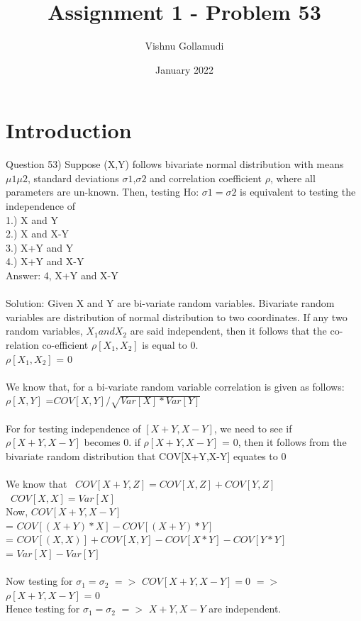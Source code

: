 \documentclass{article}
\title{Assignment 1 - Problem 53}
\author{Vishnu Gollamudi}
\date{January 2022}
\begin{document}
\maketitle

\section{Introduction}
Question 53) Suppose (X,Y) follows bivariate normal distribution with means $\mu1  \mu2$, standard deviations $\sigma1$,$\sigma2$ and correlation coefficient $\rho$, where all parameters are un-known. Then, testing Ho: $\sigma1=\sigma2$ is equivalent to testing the independence of  
\\
1.) X and Y \\
2.) X and X-Y \\
3.) X+Y and Y \\
4.) X+Y and X-Y \\

Answer: 4, X+Y and X-Y\\
\\
Solution:
Given X and Y are bi-variate random variables.  Bivariate random variables are distribution of normal distribution to two coordinates. If any two random variables, $ X_1 and X_2$ are said independent, then it follows that the co-relation co-efficient $\rho[X_1,X_2]$ is equal to 0. \\

\quad \quad \quad \quad $\rho[X_1,X_2]$  = 0 \\
\\
We know that, for a bi-variate random variable correlation is given as follows:\\
\quad \quad \quad $\rho[X,Y]$ =$ COV[X,Y] / \sqrt{Var[X] * Var[Y]}$\\
\\
For for testing independence of $[X+Y, X-Y]$, we need to see if  $\rho[X+Y,X-Y]$ becomes 0.
if  $\rho[X+Y,X-Y]$  = 0, then it follows from the bivariate random distribution that COV[X+Y,X-Y] equates to 0\\
\\
We know that \ $COV[X+Y,Z] = COV[X,Z] + COV[Y,Z]$ \ \\
\quad \ $COV[X,X] = Var[X]$ \ \\

Now, $COV[X+Y, X-Y]$ \\
= $COV[(X+Y)*X] - COV[(X+Y)*Y]$ \\
= $COV[(X,X)] + COV[X,Y] - COV[X*Y] - COV[Y*Y]$ \\
= $Var[X] - Var[Y]$\\
\\

Now testing for $\sigma_1 = \sigma_2 $ $=>$  $COV[X+Y,X-Y] = 0 $ $=>$ \\ $\rho[X+Y,X-Y]$ =  0\\
Hence testing for   $\sigma_1 = \sigma_2 $ $=>$ $X+Y, X-Y$ are independent.
\end{document}
